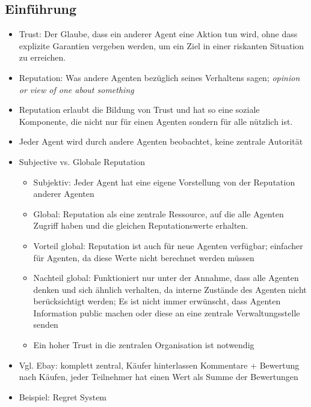 \documentclass{article} %
\begin{document}
	\subsection{Einführung}
	\begin{itemize}
		\item Trust: Der Glaube, dass ein anderer Agent eine Aktion tun wird, ohne dass explizite Garantien vergeben werden, um ein Ziel in einer riskanten Situation zu erreichen.
		\item Reputation: Was andere Agenten bezüglich seines Verhaltens sagen; \emph{opinion  or  view  of  one about  something}
		\item Reputation erlaubt die Bildung von Trust und hat so eine soziale Komponente, die nicht nur für einen Agenten sondern für alle nützlich ist.
		\item Jeder Agent wird durch andere Agenten beobachtet, keine zentrale Autorität
		\item Subjective vs. Globale Reputation
		\begin{itemize}
			\item Subjektiv: Jeder Agent hat eine eigene Vorstellung von der Reputation anderer Agenten
			\item Global: Reputation als eine zentrale Ressource, auf die alle Agenten Zugriff haben und die gleichen Reputationswerte erhalten.
			\item Vorteil global: Reputation ist auch für neue Agenten verfügbar; einfacher für Agenten, da diese Werte nicht berechnet werden müssen
			\item Nachteil global: Funktioniert nur unter der Annahme, dass alle Agenten denken und sich ähnlich verhalten, da interne Zustände des Agenten nicht berücksichtigt werden; Es ist nicht immer erwünscht, dass Agenten Information public machen oder diese an eine zentrale Verwaltungsstelle senden
			\item Ein hoher Trust in die zentralen Organisation ist notwendig
		\end{itemize}
		\item Vgl. Ebay: komplett zentral, Käufer hinterlassen Kommentare + Bewertung nach Käufen, jeder Teilnehmer hat einen Wert als Summe der Bewertungen
		\item Beispiel: Regret System
	\end{itemize}
\end{document}
